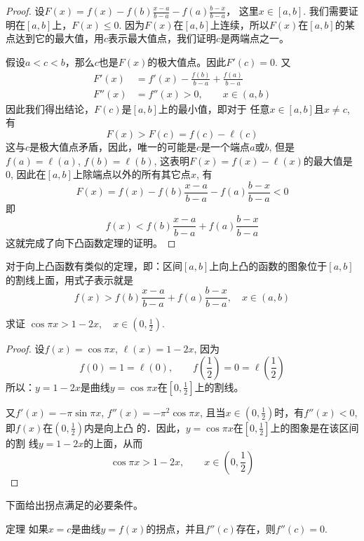 \begin{proof}
    设$F(x)=f(x)-f(b)\frac{x-a}{b-a}-f(a)\frac{b-x}{b-a}$，
    这里$x\in [a,b]$. 我们需要证明在$[a,b]$上，$F(x)\le 0$. 因为$F(x)$在$[a,b]$上连续，所以$F(x)$在$[a,b]$的某点达到它的最大值，用$c$表示最大值点，我们证明$c$是两端点之一。
    
    假设$a<c<b$，那么$c$也是$F(x)$的极大值点。因此$F'(c)=0$. 又
    \[\begin{split}
        F'(x)&=f'(x)-\frac{f(b)}{b-a}+\frac{f(a)}{b-a}\\
        F''(x)&=f''(x)>0,\qquad x\in(a,b)
    \end{split}\]
    因此我们得出结论，$F(c)$是$[a,b]$上的最小值，即对于
    任意$x\in [a,b]$且$x\ne c$, 有
    \[F (x) > F (c) =f (c) -\ell (c)\]
    这与$c$是极大值点矛盾，因此，唯一的可能是$c$是一个端点$a$或$b$, 但是$f(a)=\ell(a)$, $f(b)=\ell(b)$, 这表明$F(x)=f(x)-\ell(x)$的最大值是0, 因此在$[a,b]$上除端点以外的所有其它点$x$, 有
    \[F (x) =f (x) -f (b) \frac{x-a}{b-a}-f (a) \frac{b-x}{b-a}<0\]
    即
    \[f (x)<f (b) \frac{x-a}{b-a}+f (a) \frac{b-x}{b-a}\]
    这就完成了向下凸函数定理的证明。
    \end{proof}
    
    对于向上凸函数有类似的定理，即：区间$[a,b]$上向上凸的函数的图象位于$[a,b]$的割线上面，用式子表示就是
    \[f (x)>f (b) \frac{x-a}{b-a}+f (a) \frac{b-x}{b-a},\quad x\in(a,b)\]
    
    \begin{example}
        求证 $\cos\pi x>1-2x,\quad x\in\left(0, \frac{1}{2}\right)$.
    \end{example}
    
    
    \begin{proof}
        设$f(x)=\cos\pi x$, $\ell (x)=1-2x$, 因为
    \[f (0) =1=\ell (0) ,\qquad f \left(\frac{1}{2}\right) =0=\ell\left(\frac{1}{2}\right)\]
    所以：$y=1-2x$是曲线$y=\cos\pi x$在$\left[0,\frac{1}{2}\right]$上的割线。
    
    又$f'(x)=-\pi \sin\pi x$, $f''(x)=-\pi^2\cos\pi x$, 且当$x\in \left(0,\frac{1}{2}\right)$时，有$f''(x)<0$, 即$f(x)$在$\left(0,\frac{1}{2}\right)$内是向上凸
    的．因此，$y=\cos\pi x$在$\left[0,\frac{1}{2}\right]$上的图象是在该区间的割
    线$y=1-2x$的上面，从而
    \[\cos\pi x>1-2x,\qquad x\in \left(0,\frac{1}{2}\right)\]
    \end{proof}
    
    下面给出拐点满足的必要条件。
    
    \begin{blk}
        {定理} 如果$x=c$是曲线$y=f(x)$的拐点，并且$f''(c)$存在，则$f''(c)=0$.
    \end{blk}
    
